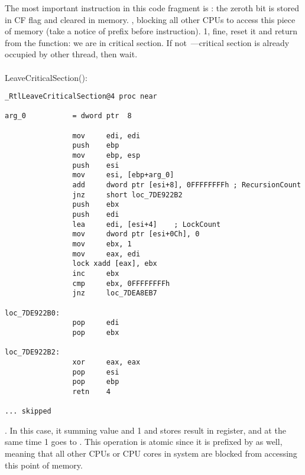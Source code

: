 {The most important instruction in this code fragment is} : 
{the zeroth bit is stored in CF flag and cleared in memory}.
, 
{blocking all other CPUs to access this piece of memory 
(take a notice of  prefix before  instruction).}
   1, 
{fine, reset it and return from the function: we are in critical section}.
{If not~---critical section is already occupied by other thread, then wait}. \\
\\
 LeaveCriticalSection():

\begin{lstlisting}[caption=Windows 2008/ntdll.dll/x86 (begin)]
_RtlLeaveCriticalSection@4 proc near

arg_0           = dword ptr  8

                mov     edi, edi
                push    ebp
                mov     ebp, esp
                push    esi
                mov     esi, [ebp+arg_0]
                add     dword ptr [esi+8], 0FFFFFFFFh ; RecursionCount
                jnz     short loc_7DE922B2
                push    ebx
                push    edi
                lea     edi, [esi+4]    ; LockCount
                mov     dword ptr [esi+0Ch], 0
                mov     ebx, 1
                mov     eax, edi
                lock xadd [eax], ebx
                inc     ebx
                cmp     ebx, 0FFFFFFFFh
                jnz     loc_7DEA8EB7

loc_7DE922B0:
                pop     edi
                pop     ebx

loc_7DE922B2:
                xor     eax, eax
                pop     esi
                pop     ebp
                retn    4

... skipped
\end{lstlisting}

 . 
{In this case, it summing  value and 1 and stores result in  register, 
and at the same time 1 goes to }.
{This operation is atomic since it is prefixed by  as well,
meaning that all other CPUs or CPU cores in system are blocked from accessing this point of memory}.

